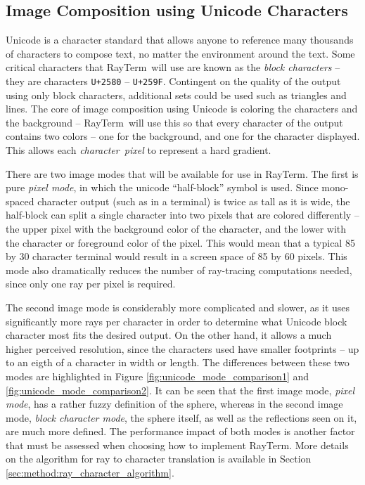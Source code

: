 \documentclass[11pt]{article}
\newcommand{\name}{{\sc RayTerm}}
\begin{document}
\subsection{Image Composition using Unicode Characters}
\label{sec:introduction:unicode}

Unicode is a character standard that allows anyone to reference many thousands of characters to compose text, no matter the environment around the text.
Some critical characters that \name\ will use are known as the {\it block characters} -- they are characters \texttt{U+2580} -- \texttt{U+259F}.
Contingent on the quality of the output using only block characters, additional sets could be used such as triangles and lines.
The core of image composition using Unicode is coloring the characters and the background -- \name\ will use this so that every character of the output contains two colors -- one for the background, and one for the character displayed.
This allows each {\it character~pixel} to represent a hard gradient.

There are two image modes that will be available for use in \name.
The first is pure {\it pixel mode}, in which the unicode ``half-block'' symbol is used.
Since mono-spaced character output (such as in a terminal) is twice as tall as it is wide, the half-block can split a single character into two pixels that are colored differently -- the upper pixel with the background color of the character, and the lower with the character or foreground color of the pixel.
This would mean that a typical 85 by 30 character terminal would result in a screen space of 85 by 60 pixels.
This mode also dramatically reduces the number of ray-tracing computations needed, since only one ray per pixel is required.

The second image mode is considerably more complicated and slower, as it uses significantly more rays per character in order to determine what Unicode block character most fits the desired output.
On the other hand, it allows a much higher perceived resolution, since the characters used have smaller footprints -- up to an eigth of a character in width or length.
The differences between these two modes are highlighted in Figure \ref{fig:unicode_mode_comparison1} and \ref{fig:unicode_mode_comparison2}.
It can be seen that the first image mode, {\it pixel mode}, has a rather fuzzy definition of the sphere, whereas in the second image mode, {\it block character mode}, the sphere itself, as well as the reflections seen on it, are much more defined.
The performance impact of both modes is another factor that must be assessed when choosing how to implement \name.
More details on the algorithm for ray to character translation is available in Section \ref{sec:method:ray_character_algorithm}.
\end{document}
